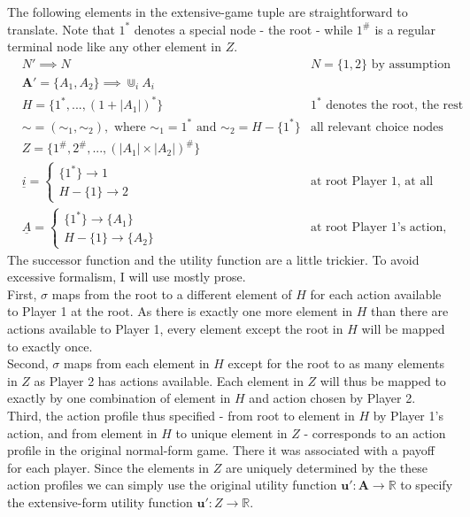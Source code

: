 \documentclass[10pt,a4paper]{article}
\begin{document}
\noindent The following elements in the extensive-game tuple are straightforward to translate. Note that $1^*$ denotes a special node - the root - while $1^{\#}$ is a regular terminal node like any other element in $Z$.
 \begin{align*}
&N' \implies N & N=\{1,2\} \text{ by assumption}\\
&\boldsymbol{A}'=\{A_1,A_2\} \implies \Cup_i A_i &\text{} \\
&H=\{1^*,...,(1+|A_1|)^*\} &\text{$1^*$ denotes the root, the rest are choice nodes for Player 2} \\
&\sim=(\sim_1,\sim_2), \text{ where $\sim_1=1^*$ and $\sim_2=H-\{1^*\}$} &\text{all relevant choice nodes are indistinguishable for Player 2}\\
&Z=\{1^{\#},2^{\#},...,(|A_1| \times |A_2|)^\# \}\\
&\underline{i}= \begin{cases}
\{1^*\} \rightarrow 1 \\
H-\{1\} \rightarrow 2 \end{cases} & \text{at root Player 1, at all other choice nodes Player 2}\\
&\underline{A}= \begin{cases}
\{1^*\}\rightarrow \{A_1\}  \\
H-\{1\} \rightarrow \{A_2\} \end{cases} & \text{at root Player 1's action, at all other choice nodes Player 2's}
\end{align*}
The successor function and the utility function are a little trickier. To avoid excessive formalism, I will use mostly prose.\\
First, $\sigma$ maps from the root to a different element of $H$ for each action available to Player 1 at the root. As there is exactly one more element in $H$ than there are actions available to Player 1, every element except the root in $H$ will be mapped to exactly once.\\
Second, $\sigma$ maps from each element in $H$ except for the root to as many elements in $Z$ as Player 2 has actions available. Each element in $Z$ will thus be mapped to exactly by one combination of element in $H$ and action chosen by Player 2.\\
Third, the action profile thus specified - from root to element in $H$ by Player 1's action, and from element in $H$ to unique element in $Z$ - corresponds to an action profile in the original normal-form game. There it was associated with a payoff for each player. Since the elements in $Z$ are uniquely determined by the these action profiles we can simply use the original utility function $\boldsymbol{u}':\boldsymbol{A}\rightarrow \mathbb{R}$ to specify the extensive-form utility function $\boldsymbol{u}':Z\rightarrow \mathbb{R}$.\\
\end{document}
